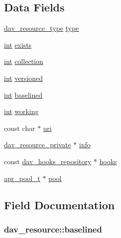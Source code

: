 \subsection*{Data Fields}
\begin{DoxyCompactItemize}
\item 
\hyperlink{group__MOD__DAV_gad94695b8d6724b766cfa9f5ec84c0fe2}{dav\+\_\+resource\+\_\+type} \hyperlink{structdav__resource_afbf280e2cffed77d6b88bc19ef24ae0e}{type}
\item 
\hyperlink{pcre_8txt_a42dfa4ff673c82d8efe7144098fbc198}{int} \hyperlink{structdav__resource_acec863f4e61f4a5454c27bb41cf09324}{exists}
\item 
\hyperlink{pcre_8txt_a42dfa4ff673c82d8efe7144098fbc198}{int} \hyperlink{structdav__resource_ac46ba5f33cdeec0bd1cccd8e548e3057}{collection}
\item 
\hyperlink{pcre_8txt_a42dfa4ff673c82d8efe7144098fbc198}{int} \hyperlink{structdav__resource_ad4da7250e7e51d3c4a581143b2089d73}{versioned}
\item 
\hyperlink{pcre_8txt_a42dfa4ff673c82d8efe7144098fbc198}{int} \hyperlink{structdav__resource_acdcb0d15f7cc6e598ebce465592aa3bf}{baselined}
\item 
\hyperlink{pcre_8txt_a42dfa4ff673c82d8efe7144098fbc198}{int} \hyperlink{structdav__resource_a22f82e1e79350eee8f78e6ec60a99d8d}{working}
\item 
const char $\ast$ \hyperlink{structdav__resource_a2bc6c2d5b1b4c45493fcff35a07fbf31}{uri}
\item 
\hyperlink{structdav__resource__private}{dav\+\_\+resource\+\_\+private} $\ast$ \hyperlink{structdav__resource_a27ebc9fd0931a822c97babe929e92ffb}{info}
\item 
const \hyperlink{structdav__hooks__repository}{dav\+\_\+hooks\+\_\+repository} $\ast$ \hyperlink{structdav__resource_a68b6668d61d787457251783e1caf4f12}{hooks}
\item 
\hyperlink{structapr__pool__t}{apr\+\_\+pool\+\_\+t} $\ast$ \hyperlink{structdav__resource_ab4d9a63baad83c01701bdefbf9375254}{pool}
\end{DoxyCompactItemize}


\subsection{Field Documentation}
\subsubsection[{\texorpdfstring{baselined}{baselined}}]{ dav\+\_\+resource\+::baselined}\hypertarget{structdav__resource_acdcb0d15f7cc6e598ebce465592aa3bf}{}\label{structdav__resource_acdcb0d15f7cc6e598ebce465592aa3bf}
